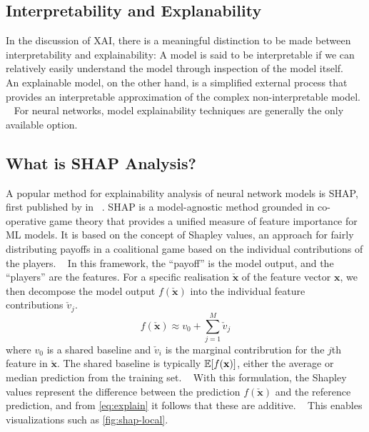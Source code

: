 \subsection{Interpretability and Explanability}

In the discussion of \ac{XAI}, there is 
a meaningful distinction to be made between 
interpretability and explainability:
A model is said to be interpretable if we can 
relatively easily understand the model through inspection
of the model itself.
~\autocite{russellArtificial2009}
An explainable model, on the other hand, is a simplified 
external process that provides an interpretable approximation
of the complex non-interpretable model.
~\autocite{lundbergUnified2017}
For neural networks,
model explainability techniques are generally 
the only available option.

\subsection{What is SHAP Analysis?} 

A popular method for explainability analysis of neural network models
is \ac{SHAP}, first published by
\citeauthor{lundbergUnified2017} in \citeyear{lundbergUnified2017}
~\autocite{lundbergUnified2017}.
SHAP is a model-agnostic method grounded in co-operative game theory
that provides a unified measure of feature importance for \ac{ML} models.
It is based on the concept of Shapley values,  
an approach for fairly distributing payoffs in a coalitional game
based on the individual contributions of the players.
~\autocite{shapley1953value}
In this framework, 
the \enquote{payoff} is the model output, 
and the \enquote{players} are the features.
For a specific realisation \(\check{\mathbf{x}}\) 
of the feature vector \(\mathbf{x}\),
we then decompose the model output \(f(\check{\mathbf{x}})\)
into the individual feature contributions \(\check{v}_{j}\).
~\autocite{aasExplaining2020}
\begin{equation}
    \label{eq:explain}
    f(\check{\mathbf{x}}) \approx v_0 + \sum_{j=1}^{M} \check{v}_{j}
\end{equation}
where \(v_0\) is a shared baseline and 
\(\check{v}_{i}\) is the marginal contribrution for the \(j\)th 
feature in \( \check{\mathbf{x}}\).
The shared baseline is typically \(\operatorname{\mathbb{E}}[f(\mathbf{x})]\), 
either the average or median prediction from the training set.
~\autocite{aasExplaining2020}
With this formulation, the Shapley values represent the difference between
the prediction \(f(\check{\mathbf{x}})\) and the reference prediction,
and from \cref{eq:explain} it follows that these are additive.
~\autocite{aasExplaining2020}
This enables visualizations such as \cref{fig:shap-local}.

